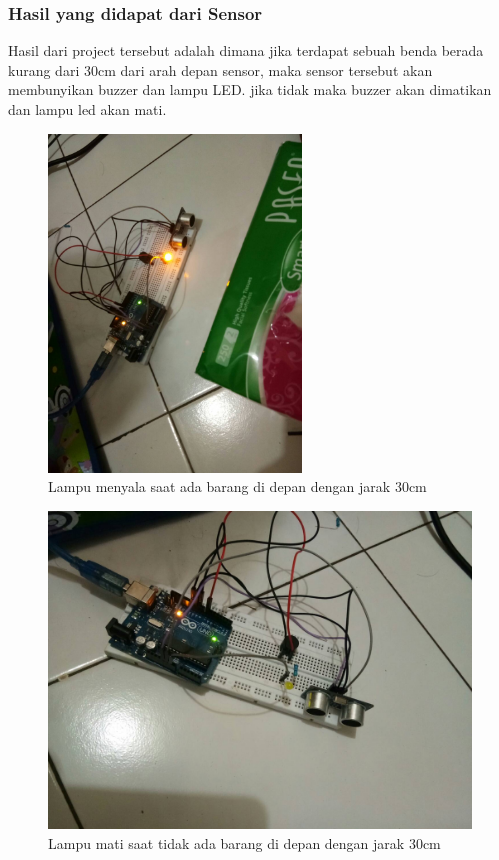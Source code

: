 \subsubsection{Hasil yang didapat dari Sensor}
Hasil dari project tersebut adalah dimana jika terdapat sebuah benda berada kurang dari 30cm dari arah depan sensor, maka sensor tersebut akan membunyikan buzzer dan lampu LED. jika tidak maka buzzer akan dimatikan dan lampu led akan mati.
\begin{figure}[ht]
\centerline{\includegraphics[width=0.6\textwidth]{figures/adabarang.jpg}}
\caption{Lampu menyala saat ada barang di depan dengan jarak 30cm}
\label{lampunyala}
\end{figure}
\begin{figure}[ht]
\centerline{\includegraphics[width=1\textwidth]{figures/tidakada.jpg}}
\caption{Lampu mati saat tidak ada barang di depan dengan jarak 30cm}
\label{lampumati}
\end{figure}
